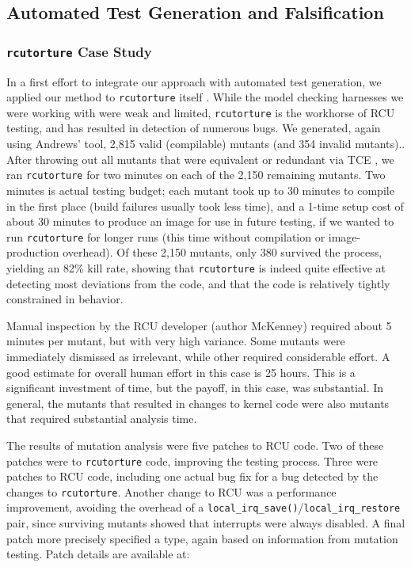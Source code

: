 \documentclass{svjour3}
\begin{document}
\subsection{Automated Test Generation and Falsification}

\subsubsection {{\tt rcutorture} Case Study}

In a first effort to integrate our approach with automated test generation, we applied our method to {\tt rcutorture} \cite{rcutorture}
itself \cite{mutKernel}.  While the model checking harnesses we were working with were
weak and limited, {\tt rcutorture} is the workhorse of RCU testing,
and has resulted in detection of numerous bugs.  We generated, again
using Andrews' tool, 2,815 valid (compilable) mutants (and 354 invalid
mutants)..  After throwing out
all mutants that were equivalent or
redundant via TCE \cite{TCE}, we ran {\tt rcutorture} for two minutes
on each of the 2,150
remaining mutants.  Two minutes is actual testing
budget; each mutant took up to 30 minutes to compile in the first
place (build failures usually took less time), and a
1-time setup cost of about 30 minutes to produce an image for use in
future testing, if we wanted to run {\tt rcutorture} for longer runs
(this time without compilation or image-production overhead).
Of these 2,150 mutants, only 380 survived the process, yielding an
82\% kill rate, showing
that {\tt rcutorture} is indeed quite effective at detecting most
deviations from the code, and that the code is relatively tightly
constrained in behavior.

Manual inspection by the RCU developer (author McKenney) required
about 5 minutes per mutant, but with very high variance.  Some mutants were
immediately dismissed as irrelevant, while other required considerable
effort.  A good estimate for overall human effort in this case is 25
hours.  This is a significant investment of time, but the payoff, in
this case, was substantial.  In general, the mutants that resulted in
changes to kernel code were also mutants that required substantial
analysis time.

The results of mutation analysis were five patches to RCU code.  Two
of these patches were to {\tt rcutorture} code, improving the testing
process.  Three were patches to RCU code, including one actual bug
fix for a bug detected by the changes to {\tt rcutorture}.  Another
change to RCU was a performance improvement, avoiding the overhead of
a {\tt local\_irq\_save()}/{\tt local\_irq\_restore} pair, since
surviving mutants showed that interrupts were always disabled.  A
final patch more precisely specified a type, again based on
information from mutation testing.  Patch details are available at:
\end{document}
